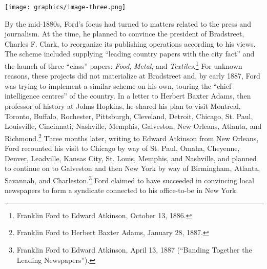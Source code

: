 \documentclass[twoside,symmetric,nobib,justified]{tufte-book}
\begin{document}
\begin{figure*}
   \texttt{[image: graphics/image-three.png]}
   \label{fig:fig3}
\end{figure*}


\newpage By the mid-1880s, Ford's focus had turned to matters related to the
press and journalism. At the time, he planned to convince the president
of Bradstreet, Charles F. Clark, to reorganize its publishing operations
according to his views. The scheme included supplying ``leading country
papers with the city fact'' and the launch of three ``class'' papers:
\emph{Food}, \emph{Metal}, and \emph{Textiles}.\footnote{Franklin Ford
  to Edward Atkinson, October 13, 1886.} For unknown reasons, these
projects did not materialize at Bradstreet and, by early 1887, Ford was
trying to implement a similar scheme on his own, touring the ``chief
intelligence centres'' of the country. In a letter to Herbert Baxter
Adams, then professor of history at Johns Hopkins, he shared his plan to
visit Montreal, Toronto, Buffalo, Rochester, Pittsburgh, Cleveland,
Detroit, Chicago, St. Paul, Louisville, Cincinnati, Nashville, Memphis,
Galveston, New Orleans, Atlanta, and Richmond.\footnote{Franklin Ford to
  Herbert Baxter Adams, January 28, 1887.} Three months later, writing
to Edward Atkinson from New Orleans, Ford recounted his visit to Chicago
by way of St. Paul, Omaha, Cheyenne, Denver, Leadville, Kansas City, St.
Louis, Memphis, and Nashville, and planned to continue on to Galveston
and then New York by way of Birmingham, Atlanta, Savannah, and
Charleston.\footnote{Franklin Ford to Edward Atkinson, April 13, 1887
  (``Banding Together the Leading Newspapers'').} Ford claimed to have
succeeded in convincing local newspapers to form a syndicate connected
to his office-to-be in New York.
\end{document}
